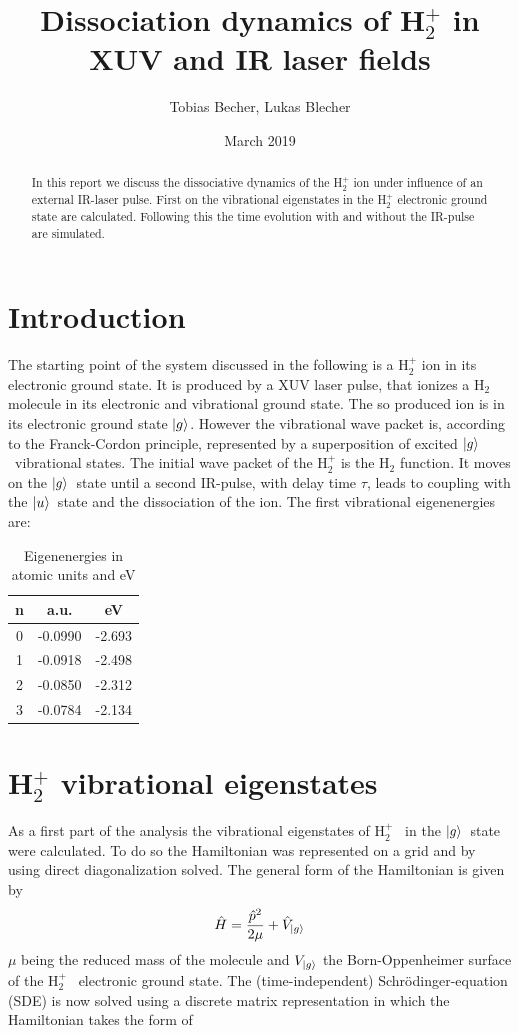 \documentclass[12pt]{article}
\title{Dissociation dynamics of H$_2^+$ in XUV and IR laser fields}
\author{Tobias Becher, Lukas Blecher}
\date{March 2019}
\newcommand{\hp}{H$_2^+$ }
\newcommand{\gr}{$\ket{g}$}
\newcommand{\us}{$\ket{u}$}
\begin{document}
\maketitle
\begin{abstract}
In this report we discuss the dissociative dynamics of the \hp ion under influence of an external IR-laser pulse. First on the vibrational eigenstates in the \hp electronic ground state are calculated. Following this the time evolution with and without the IR-pulse are simulated.
\end{abstract}


\section{Introduction}
The starting point of the system discussed in the following is a \hp  ion in its electronic ground state. It is produced by a XUV laser pulse, that ionizes a H$_2$ molecule in its electronic and vibrational ground state. The so produced ion is in its electronic ground state \gr. However the vibrational wave packet is, according to the Franck-Cordon principle, represented by a superposition of excited \gr \ vibrational states. The initial wave packet of the \hp is the H$_2$ function. It moves on the \gr \ state until a second IR-pulse, with delay time $\tau$, leads to coupling with the \us \ state and the dissociation of the ion. The first vibrational eigenenergies are:
\begin{table}[H]\centering\label{tab:vibEnergies}
\begin{tabular}{@{}ccc@{}}
\toprule
n & a.u. & eV \\ \midrule
0&-0.0990&-2.693\\
1&-0.0918&-2.498\\
2&-0.0850&-2.312\\
3&-0.0784&-2.134\\\bottomrule
\end{tabular}
\caption{Eigenenergies in atomic units and eV}
\end{table}
\section{H$_2^+$ vibrational eigenstates}
As a first part of the analysis the vibrational eigenstates of \hp\ in the 
\gr\ state were calculated. To do so the Hamiltonian was represented on a grid and by using direct diagonalization solved.
The general form of the Hamiltonian is given by 
\begin{equation}\label{eqn:generalHamiltonian}
    \hat{H}=\frac{\hat{p}^2}{2\mu}+\hat{V}_{\ket{g}}
\end{equation}
$\mu$ being the reduced mass of the molecule and $V_{\ket{g}}$ the Born-Oppenheimer surface of the \hp\ electronic ground state.
The (time-independent) Schr\"odinger-equation (SDE) is now solved using a discrete matrix representation in which the Hamiltonian takes the form of
\end{document}
